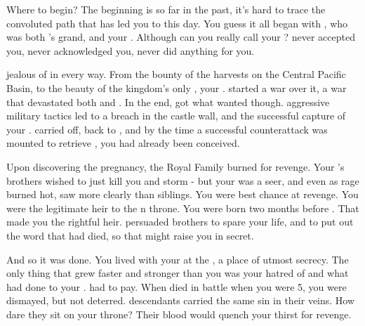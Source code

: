 \documentclass[char]{NeptuneBall}
\begin{document}
\name{\cManta{}}



Where to begin? The beginning is so far in the past, it's hard to trace the convoluted path that has led you to this day. You guess it all began with \cExExKing{\King} \cExExKing{}, who was both \cKing{\King} \cKing{}'s grand\cExExKing{\parent}, and your \cExExKing{\parent}. Although can you really call \cExExKing{\them} your \cExExKing{\parent}? \cExExKing{\They} never accepted you, never acknowledged you, never did anything for you.

\cExExKing{\They} \cExExKing{\were} jealous of \pPacifica{} in every way. From the bounty of the harvests on the Central Pacific Basin, to the beauty of the kingdom's only \cMother{\prince}, your \cMother{\parent} \cMother{\MYname}. \cExExKing{} started a war over it, a war that devastated both \pPacifica{} and \pAtlantis{}. In the end, \cExExKing{\they} got what \cExExKing{\they} wanted though. \cExExKing{\Their} aggressive military tactics led to a breach in the castle wall, and the successful capture of your \cMother{\parent}. \cExExKing{} carried \cMother{\them} off, back to \pAtlantis{}, and by the time a successful counterattack was mounted to retrieve \cMother{\them}, you had already been conceived.

Upon discovering the pregnancy, the Royal Family burned for revenge. Your \cMother{\parent}'s brothers wished to just kill you and storm \pAtlantis{} - but your \cMother{\parent} was a seer, and even as \cMother{\their} rage burned hot, \cMother{\they} saw more clearly than \cMother{\their} siblings. You were \cMother{\their} best chance at revenge. You were the legitimate heir to the \pAtlantis{}n throne. You were born two months before \cExKing{}. That made you the rightful heir. \cMother{} persuaded \cMother{\their} brothers to spare your life, and to put out the word that \cMother{\they} had died, so that \cMother{\they} might raise you in secret.

And so it was done. You lived with your \cMother{\parent} at the \pAssassin{}, a place of utmost secrecy. The only thing that grew faster and stronger than you was your hatred of \cExExKing{} and what had done to your \cMother{\parent}. \cExExKing{} had to pay. When \cExExKing{\they} died in battle when you were 5, you were dismayed, but not deterred. \cExExKing{\Their} descendants carried the same sin in their veins. How dare they sit on your throne? Their blood would quench your thirst for revenge. 
\end{document}
